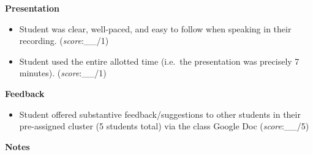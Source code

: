 \documentclass[
  11pt,
]{article}
\providecommand{\tightlist}{%
  \setlength{\itemsep}{0pt}\setlength{\parskip}{0pt}}
\begin{document}
\textbf{Presentation}

\begin{itemize}
\tightlist
\item
  Student was clear, well-paced, and easy to follow when speaking in
  their recording. (\emph{score}:\_\_/1)
\item
  Student used the entire allotted time (i.e.~the presentation was
  precisely 7 minutes). (\emph{score}:\_\_/1)
\end{itemize}

\textbf{Feedback}

\begin{itemize}
\tightlist
\item
  Student offered substantive feedback/suggestions to other students in
  their pre-assigned cluster (5 students total) via the class Google Doc
  (\emph{score}:\_\_/5)
\end{itemize}

\textbf{Notes}
\end{document}
